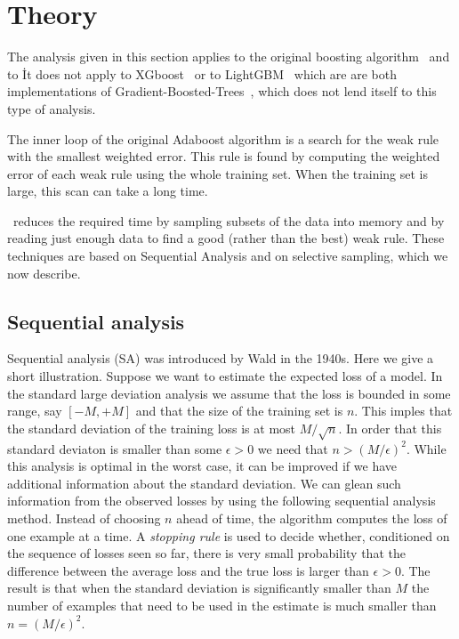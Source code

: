 \section{Theory}
The analysis given in this section applies to the original boosting
algorithm~\cite{orig, confidence-rated, adtrees} and to \Sparrow\. It
does not apply to XGboost~\cite{} or to LightGBM~\cite{} which are are
both implementations of Gradient-Boosted-Trees~\cite{}, which does not
lend itself to this type of analysis.

The inner loop of the original Adaboost algorithm is a search for the
weak rule with the smallest weighted error. This rule is found by
computing the weighted error of each weak rule using the whole
training set. When the training set is large, this scan can take a
long time.

\Sparrow\ reduces the required time by sampling subsets of the data into
memory and by reading just enough data to find a good (rather than the
best) weak rule. These techniques are based on Sequential Analysis and
on selective sampling, which we now describe.

\subsection{Sequential analysis}
Sequential analysis (SA) was introduced by
Wald\cite{wald_sequential_1973} in the 1940s.  Here we give a short
illustration. Suppose we want to estimate the expected loss of a
model. In the standard large deviation analysis we assume that the
loss is bounded in some range, say $[-M,+M]$ and that the size of the
training set is $n$. This imples that the standard deviation of the
training loss is at most $M/\sqrt{n}$. In order that this standard
deviaton is smaller than some $\epsilon>0$ we need that
$n > (M/\epsilon)^2$. While this analysis is optimal in the worst case, it
can be improved if we have additional information about the standard
deviation. We can glean such information from the observed losses by
using the following sequential analysis method. Instead of choosing
$n$ ahead of time, the algorithm computes the loss of one example at a
time. A {\em stopping rule} is used to decide whether, conditioned on
the sequence of losses seen so far, there is very small probability
that the difference between the average loss and the true loss is
larger than $\epsilon>0$. The result is that when the standard
deviation is significantly smaller than $M$ the number of examples
that need to be used in the estimate is much smaller than
$n=(M/\epsilon)^2$.

